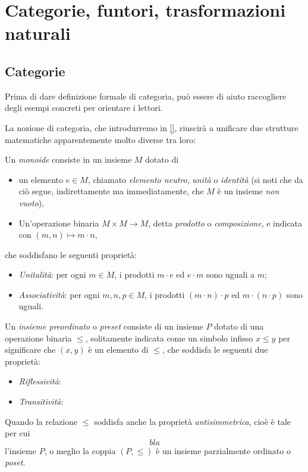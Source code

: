 \chapter{Categorie, funtori, trasformazioni naturali}

\section{Categorie}\label{categorie}

Prima di dare definizione formale di categoria, può essere di aiuto raccogliere degli esempi concreti per orientare i lettori.

La nozione di categoria, che introdurremo in \autoref{}, riuscirà a unificare due strutture matematiche apparentemente molto diverse tra loro:
\begin{definition}
	Un \emph{monoide} consiste in un insieme \(M\) dotato di
	\begin{itemize}
		\item un elemento \(e\in M\), chiamato \emph{elemento neutro}, \emph{unità} o \emph{identità} (si noti che da ciò segue, indirettamente ma immediatamente, che \(M\) è un insieme \emph{non vuoto}),
		\item Un'operazione binaria \(M\times M\to M\), detta \emph{prodotto} o \emph{composizione}, e indicata con \((m,n)\mapsto m\cdot n\),
	\end{itemize}
	che soddisfano le seguenti proprietà:
	\begin{itemize}
		\item \emph{Unitalità}: per ogni \(m\in M\), i prodotti \(m \cdot e\) ed \(e\cdot m\) sono uguali a \(m\);
		\item \emph{Associatività}: per ogni \(m,n,p\in M\), i prodotti \((m\cdot n)\cdot p\) ed \(m\cdot (n\cdot p)\) sono uguali.
	\end{itemize}
\end{definition}
\begin{definition}
	Un \emph{insieme preordinato} o \emph{preset} consiste di un insieme \(P\) dotato di una operazione binaria \(\le\), solitamente indicata come un simbolo infisso \(x\le y\) per significare che \((x,y)\) è un elemento di \(\le\), che soddisfa le seguenti due proprietà:
	\begin{itemize}
		\item \emph{Riflessività}: \Todo{}
		\item \emph{Transitività}: \Todo{}
	\end{itemize}
	Quando la relazione \(\le\) soddisfa anche la proprietà \emph{antisimmetrica}, cioè è tale per cui
	\[bla\]
	l'insieme \(P\), o meglio la coppia \((P,\le)\) è un insieme parzialmente ordinato o \emph{poset}.
\end{definition}
